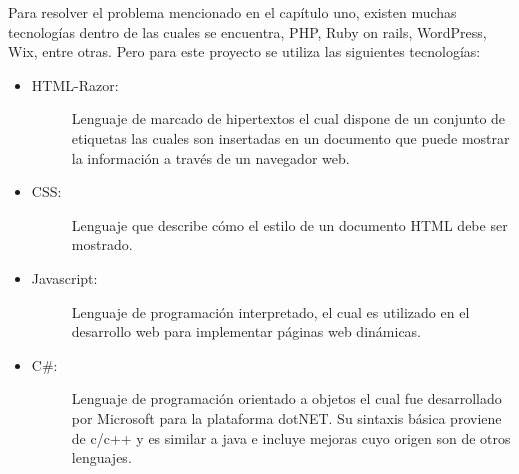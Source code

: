 Para resolver el problema mencionado en el capítulo uno, existen muchas tecnologías dentro de las cuales se encuentra, PHP, Ruby on rails, WordPress, Wix, entre otras. Pero para este proyecto se utiliza las siguientes tecnologías: 
\begin{itemize}
    \item   \begin{description}
                \item[HTML-Razor:] Lenguaje de marcado de hipertextos el cual dispone de un conjunto de etiquetas las cuales son insertadas en un documento que puede mostrar la información a través de un navegador web. 
            \end{description}

    \item   \begin{description}
                \item[CSS:] Lenguaje que describe cómo el estilo de un documento HTML debe ser mostrado. 
            \end{description}

    \item   \begin{description}
                \item[Javascript:] Lenguaje de programación interpretado, el cual es utilizado en el desarrollo web para implementar páginas web dinámicas.
            \end{description}

    \item   \begin{description}
                \item[C\#:] Lenguaje de programación orientado a objetos el cual fue desarrollado por Microsoft para la plataforma dotNET. Su sintaxis básica proviene de c/c++ y es similar a java e incluye mejoras cuyo origen son de otros lenguajes.
            \end{description}
    
\end{itemize}